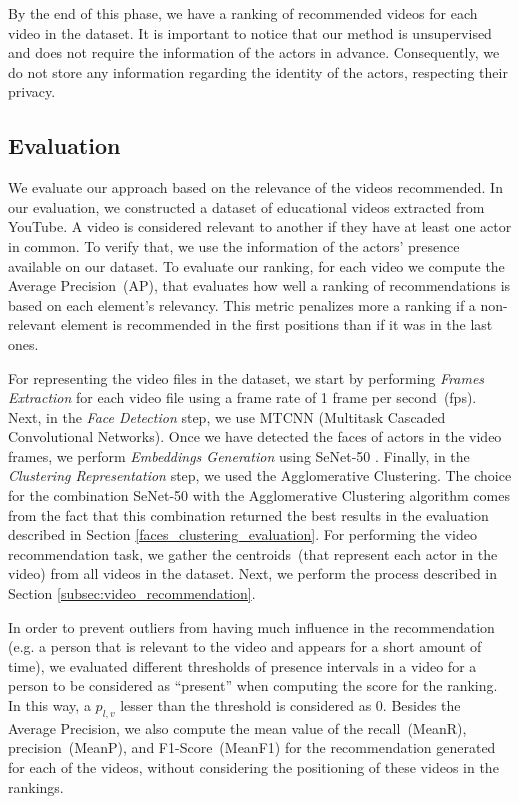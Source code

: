 By the end of this phase, we have a ranking of recommended videos for each video in the dataset.
It is important to notice that our method is unsupervised and does not require the information of the actors in advance.
Consequently, we do not store any information regarding the identity of the actors, respecting their privacy.

\subsection{Evaluation}
We evaluate our approach based on the relevance of the videos recommended. 
In our evaluation, we constructed a dataset of educational videos extracted from YouTube.
A video is considered relevant to another if they have at least one actor in common.
To verify that, we use the information of the actors' presence available on our dataset.
To evaluate our ranking, for each video we compute the Average Precision~(AP), that evaluates how well a ranking of recommendations is based on each element's relevancy. 
This metric penalizes more a ranking if a non-relevant element is recommended in the first positions than if it was in the last ones.


For representing the video files in the dataset, we start by performing \emph{Frames Extraction} for each video file using a frame rate of 1 frame per second~(fps). 
Next, in the \emph{Face Detection} step, we use MTCNN \cite{mtcnn} (Multitask
Cascaded Convolutional Networks). 
Once we have detected the faces of actors in the video frames, we perform \emph{Embeddings Generation} using SeNet-50 \cite{senet}.
Finally, in the \emph{Clustering Representation} step, we used the Agglomerative Clustering.
The choice for the combination SeNet-50 with the Agglomerative Clustering algorithm comes from the fact that this combination returned the best results in the evaluation described in Section \ref{faces_clustering_evaluation}.
For performing the video recommendation task, we gather the centroids~(that represent each actor in the video) from all videos in the dataset. Next, we perform the process described in Section \ref{subsec:video_recommendation}.

In order to prevent outliers from having much influence in the recommendation (e.g. a person that is relevant to the video and appears for a short amount of time), we evaluated different thresholds of presence intervals in a video for a person to be considered as ``present'' when computing the score for the ranking. 
In this way, a $p_{l,v}$ lesser than the threshold is considered as $0$.
Besides the Average Precision, we also compute the mean value of the recall~(MeanR), precision~(MeanP), and F1-Score~(MeanF1) for the recommendation generated for each of the videos, without considering the positioning of these videos in the rankings.

